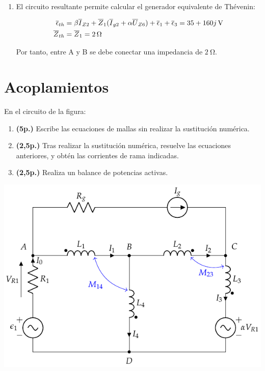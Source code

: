 \documentclass[12pt]{article}
\begin{document}
\begin{enumerate}
\item El circuito resultante permite calcular el generador equivalente
  de Thévenin:


  \begin{align*}
    \overline{\epsilon}_{th} &= \beta \overline{I}_{Z2} + \overline{Z}_1 (\overline{I}_{g2} + \alpha \overline{U}_{Z6}) + \overline{\epsilon}_1 + \overline{\epsilon}_3 = \SI[parse-numbers=false]{35 + 160 j}{\volt}\\
    \overline{Z}_{th} &= \overline{Z}_1 = \SI{2}{\ohm}
  \end{align*}

  Por tanto, entre A y B se debe conectar una impedancia de
  $\SI{2}{\ohm}$.
   

\end{enumerate}
\clearpage

\section*{Acoplamientos}


En el circuito de la figura:
\begin{enumerate}
\item \textbf{(5p.)} Escribe las ecuaciones de mallas sin realizar la sustitución numérica.
\item \textbf{(2,5p.)} Tras realizar la sustitución numérica, resuelve las ecuaciones anteriores, y obtén las corrientes de rama indicadas.
\item \textbf{(2,5p.)} Realiza un balance de potencias activas.
\end{enumerate}

\begin{center}
  \includegraphics[height=0.4\textheight]{figs/acoplamientos_extra.pdf}
\end{center}
\end{document}
